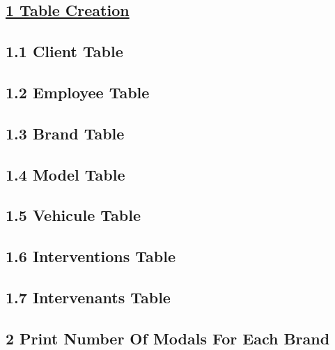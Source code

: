 \newpage

\vspace{0.35cm}
\subsection*{\underline{1 Table Creation}}
\subsection*{1.1 Client Table}


\subsection*{1.2 Employee Table}


\subsection*{1.3 Brand Table}


\subsection*{1.4 Model Table}



\newpage
\subsection*{1.5 Vehicule Table}


\subsection*{1.6 Interventions Table}


\subsection*{1.7 Intervenants Table}



\newpage
\subsection*{2 Print Number Of Modals For Each Brand}

